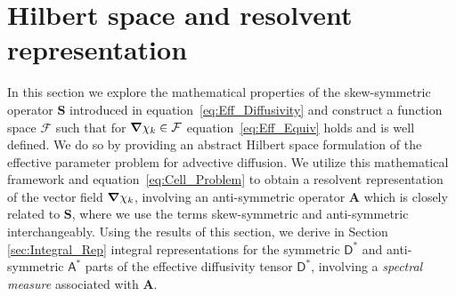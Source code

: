 \documentclass[leqno,onefignum,onetabnum]{siamltex1213}
\newcommand{\Sb}{\mathbf{S}}
\newcommand{\Ab}{\mathbf{A}}
\newcommand{\Fc}{\mathcal{F}}
\newcommand{\Dm}{\mathsf{D}}
\newcommand{\Am}{\mathsf{A}}
\newcommand\bnabla{\mbox{\boldmath${\nabla}$}}
\begin{document}
\section{Hilbert space and resolvent
  representation} \label{sec:Hilbert_Space}   
%
In this section we explore the mathematical properties of the
skew-symmetric operator $\Sb$ introduced in
equation~\eqref{eq:Eff_Diffusivity} and construct a function space
$\Fc$ such that for $\bnabla \chi_k\in\Fc$ equation~\eqref{eq:Eff_Equiv}
holds and is 
well defined. We do so by providing an abstract Hilbert space
formulation of the effective parameter problem for advective
diffusion. We utilize this mathematical framework and
equation~\eqref{eq:Cell_Problem}  to obtain a resolvent representation
of the vector field $\bnabla \chi_k$, involving an anti-symmetric
operator $\Ab$ 
which is closely related to $\Sb$, where we use the terms
skew-symmetric and anti-symmetric interchangeably. Using the results
of this section, we derive in Section \ref{sec:Integral_Rep} integral
representations for the symmetric $\Dm^*$ and anti-symmetric
$\Am^*$ parts of the effective diffusivity tensor $\Dm^*$,
involving a \emph{spectral measure} associated with $\Ab$.       
\end{document}
